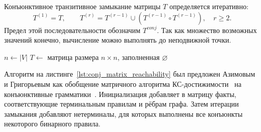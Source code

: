 Конъюнктивное транзитивное замыкание матрицы $T$ определяется итеративно:
\[
    T^{(1)} = T, \qquad T^{(r)} = T^{(r-1)} \cup (T^{(r-1)} \circ T^{(r-1)}), \quad r \geq 2.
\]
Предел этой последовательности обозначим $T^{\mathit{conj}}$. Так как множество возможных значений конечно, вычисление можно выполнять до неподвижной точки.

\begin{algorithm}[H]
    \footnotesize
    \caption{Матричный алгоритм для конъюнктивных грамматик}
    \label{lst:conj_matrix_reachability}
    $n \gets |V|$\;
    $T \gets$ матрица размера $n \times n$, заполненная $\varnothing$\;
    \;
\end{algorithm}

Алгоритм на листинге~\ref{lst:conj_matrix_reachability} был предложен Азимовым и Григорьевым как обобщение матричного алгоритма КС-достижимости~ на конъюнктивные грамматики~. Инициализация добавляет в матрицу факты, соответствующие терминальным правилам и рёбрам графа. Затем итерации замыкания добавляют нетерминалы, для которых выполнены все конъюнкты некоторого бинарного правила.

